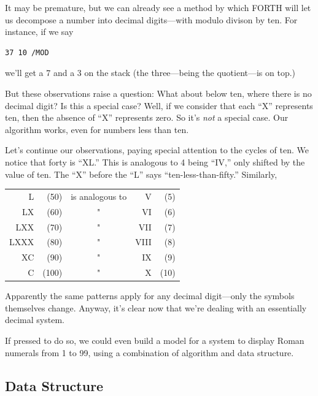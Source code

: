 \noindent It may be premature, but we can already see a method by
which FORTH will let us decompose a number into decimal digits---with
modulo divison by ten. For instance, if we say

\begin{verbatim}
37 10 /MOD
\end{verbatim}
we'll get a 7 and a 3 on the stack (the three---being the quotient---is on
top.)

But these observations raise a question: What about below ten,
where there is no decimal digit? Is this a special case? Well, if we consider
that each ``X'' represents ten, then the absence of ``X'' represents zero.
So it's \emph{not} a special case. Our algorithm works, even for numbers less
than ten.

Let's continue our observations, paying special attention to the
cycles of ten. We notice that forty is ``XL.'' This is analogous to 4 being
``IV,'' only shifted by the value of ten. The ``X'' before the ``L'' says
``ten-less-than-fifty.'' Similarly,

\bigskip
{\sf\begin{tabular}{rrcrr}
   L &  (50) &   is analogous to &     V & (5) \\
  LX &  (60) &          "        &    VI & (6) \\
 LXX &  (70) &          "        &   VII & (7) \\
LXXX &  (80) &          "        &  VIII & (8) \\
  XC &  (90) &          "        &    IX & (9) \\
   C & (100) &          "        &     X & (10) \\
\end{tabular}}
\bigskip

Apparently the same patterns apply for any decimal digit---only the
symbols themselves change. Anyway, it's clear now that we're dealing with
an essentially decimal system.

If pressed to do so, we could even build a model for a system to display
Roman numerals from 1 to 99, using a combination of algorithm and
data structure.

{\othersidetrue\subsection{Data Structure}}

